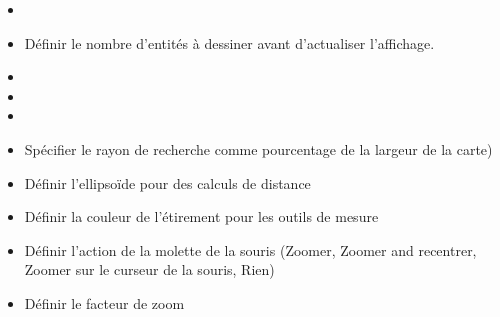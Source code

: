 %


\begin{itemize}
\item {}
\item D\'efinir le nombre d'entit\'es \`a dessiner avant d'actualiser l'affichage.
\item {}
\item {}
\item {} 
\end{itemize}

%


\begin{itemize}
\item Sp\'ecifier le rayon de recherche comme pourcentage de la largeur de la carte)
\item D\'efinir l'ellipso\"ide pour des calculs de distance
\item D\'efinir la couleur de l'\'etirement pour les outils de mesure
\item D\'efinir l'action de la molette de la souris (Zoomer, Zoomer and recentrer, Zoomer sur le curseur de la souris, Rien)
\item D\'efinir le facteur de zoom
\end{itemize}

